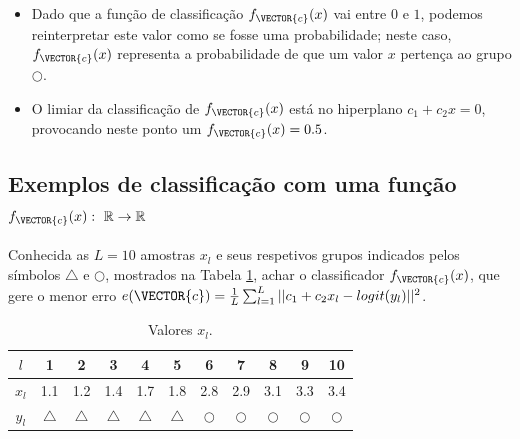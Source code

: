 \begin{tcbattention}
\begin{itemize}
\item Dado que a função de classificação $f_{\VECTOR{c}}(x)$ vai entre $0$ e $1$,
podemos reinterpretar este valor como se fosse uma probabilidade;
neste caso, $f_{\VECTOR{c}}(x)$ representa a probabilidade de que um valor $x$
pertença ao grupo $\bigcirc$.
\item O limiar da classificação de $f_{\VECTOR{c}}(x)$ está no hiperplano $c_1  +c_2x=0$,
provocando neste ponto um $f_{\VECTOR{c}}(x)=0.5$.
\end{itemize}
\end{tcbattention}



\subsection{Exemplos de classificação com uma função
$f_{\VECTOR{c}}(x):~\mathbb{R} \rightarrow \mathbb{R}$ }

\begin{example}\label{ex:theo:reglogr1r1}
Conhecida as $L=10$ amostras $x_l$ e seus respetivos grupos indicados pelos símbolos $\bigtriangleup$ e $\bigcirc$, 
mostrados na Tabela \ref{table:theo:reglogr1r1:xn},
achar o classificador $f_{\VECTOR{c}}(x)$, 
que gere o menor erro $e(\VECTOR{c}) = \frac{1}{L} \sum_{l=1}^{L} ||c_1 +c_2 x_l -logit(y_l)||^2$.
\end{example}


\begin{table}[h!]
\centering
\begin{tabular}{|c||c|c|c|c|c||c|c|c|c|c|} 
 \hline
$l$   & 1 & 2 & 3 & 4 & 5 & 6 & 7 & 8 & 9 & 10 \\ \hline \hline
$x_l$ & 1.1 & 1.2 & 1.4 & 1.7 & 1.8 & 2.8 & 2.9 & 3.1 & 3.3 & 3.4  \\ \hline
$y_l$ & $\bigtriangleup$ & $\bigtriangleup$ & $\bigtriangleup$ & $\bigtriangleup$ & $\bigtriangleup$
      & $\bigcirc$ & $\bigcirc$ & $\bigcirc$ & $\bigcirc$ & $\bigcirc$ \\ \hline
\end{tabular}
\caption{Valores $x_l$.}
\label{table:theo:reglogr1r1:xn}
\end{table}


